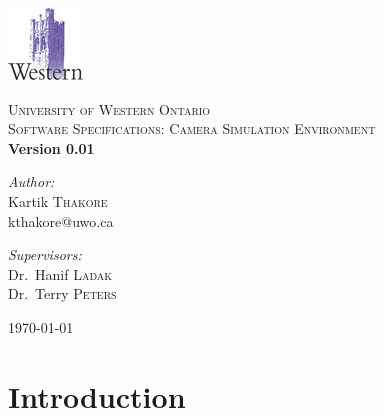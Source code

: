 \documentclass[11pt]{report}
\begin{document}
\begin{titlepage}

\begin{center}


\includegraphics[scale=1.0]{images/logo.png}

\textsc{\LARGE University of Western Ontario}\\[1.5cm]

\textsc{\Large Software Specifications: Camera Simulation Environment}\\[0.5cm]


{ \huge \bfseries Version 0.01}\\[0.4cm]

\begin{minipage}{0.4\textwidth}
\begin{flushleft} \large
\emph{Author:}\\
Kartik \textsc{Thakore} \\
kthakore@uwo.ca 
\end{flushleft}
\end{minipage}
\begin{minipage}{0.4\textwidth}
\begin{flushright} \large
\emph{Supervisors:} \\
Dr.~Hanif \textsc{Ladak}\\
Dr.~Terry \textsc{Peters} 
\end{flushright}
\end{minipage}

\vfill

{\large \today}

\end{center}

\end{titlepage}

\nocite{*}

\tableofcontents

\listoffigures 

\printglossaries


\newpage 

\chapter{Introduction}
  
\end{document}
